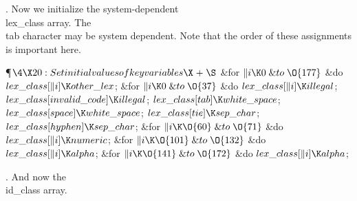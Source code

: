 .
Now we initialize the system-dependent \\{lex\_class} array.  The \\{tab}
character may be system dependent.  Note that the order of these
assignments is important here.

\Y\P$\4\X20:Set initial values of key variables\X\mathrel{+}\S$\6
\&{for} $\|i\K0\mathrel{\&{to}}\O{177}$ \1\&{do}\5
$\\{lex\_class}[\|i]\K\\{other\_lex}$;\2\6
\&{for} $\|i\K0\mathrel{\&{to}}\O{37}$ \1\&{do}\5
$\\{lex\_class}[\|i]\K\\{illegal}$;\2\6
$\\{lex\_class}[\\{invalid\_code}]\K\\{illegal}$;\5
$\\{lex\_class}[\\{tab}]\K\\{white\_space}$;\5
$\\{lex\_class}[\\{space}]\K\\{white\_space}$;\5
$\\{lex\_class}[\\{tie}]\K\\{sep\_char}$;\5
$\\{lex\_class}[\\{hyphen}]\K\\{sep\_char}$;\6
\&{for} $\|i\K\O{60}\mathrel{\&{to}}\O{71}$ \1\&{do}\5
$\\{lex\_class}[\|i]\K\\{numeric}$;\2\6
\&{for} $\|i\K\O{101}\mathrel{\&{to}}\O{132}$ \1\&{do}\5
$\\{lex\_class}[\|i]\K\\{alpha}$;\2\6
\&{for} $\|i\K\O{141}\mathrel{\&{to}}\O{172}$ \1\&{do}\5
$\\{lex\_class}[\|i]\K\\{alpha}$;\2\par
\fi

.
And now the \\{id\_class} array.

